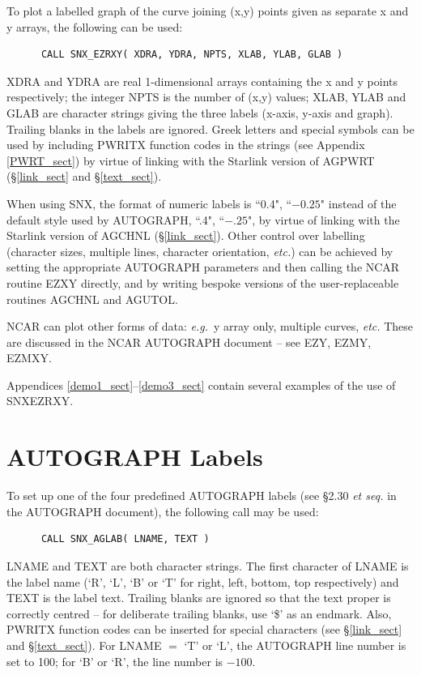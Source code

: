 \documentclass[twoside,11pt]{article}
\renewcommand{\_}{\texttt{\symbol{95}}}
\begin{document}
To plot a labelled graph of the curve joining (x,y) points given as separate x
and y arrays, the following can be used:

\begin{verbatim}
      CALL SNX_EZRXY( XDRA, YDRA, NPTS, XLAB, YLAB, GLAB )
\end{verbatim}

XDRA and YDRA are real 1-dimensional arrays containing the x and y points
respectively; the integer NPTS is the number of (x,y) values; XLAB, YLAB and
GLAB are character strings giving the three labels (x-axis, y-axis and graph).
Trailing blanks in the labels are ignored.
Greek letters and special symbols can be used by including PWRITX function
codes in the strings (see Appendix \ref{PWRT_sect}) by virtue of linking with 
the Starlink version of AGPWRT (\S\ref{link_sect} and \S\ref{text_sect}).

When using SNX, the format of numeric labels is ``0.4", ``$-0.25$" instead of
the default style used by AUTOGRAPH, ``.4", ``$-.25$", by virtue of linking
with the Starlink version of AGCHNL (\S\ref{link_sect}).
Other control over labelling (character sizes, multiple lines, character
orientation, {\em etc.}) can be achieved by setting the appropriate AUTOGRAPH
parameters and then calling the NCAR routine EZXY directly, and by writing
bespoke versions of the user-replaceable routines AGCHNL and AGUTOL.

NCAR can plot other forms of data: {\em e.g.}\ y array only, multiple curves,
{\em etc.}
These are discussed in the NCAR AUTOGRAPH document -- see EZY, EZMY, EZMXY.

Appendices \ref{demo1_sect}--\ref{demo3_sect} contain several examples of the
use of SNX\_EZRXY.


\section {AUTOGRAPH Labels}

To set up one of the four predefined AUTOGRAPH labels (see \S 2.30 {\em et
seq.} in the AUTOGRAPH document), the following call may be used:

\begin{verbatim}
      CALL SNX_AGLAB( LNAME, TEXT )
\end{verbatim}

LNAME and TEXT are both character strings.
The first character of LNAME is the label name (`R', `L', `B' or `T' for
right, left, bottom, top respectively) and TEXT is the label text.
Trailing blanks are ignored so that the text proper is correctly centred --
for deliberate trailing blanks, use `\$' as an endmark.
Also, PWRITX function codes can be inserted for special characters (see
\S\ref{link_sect} and \S\ref{text_sect}).
For LNAME $=$ `T' or `L', the AUTOGRAPH line number is set to 100; for `B' or
`R', the line number is $-100$.
\end{document}
